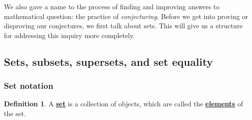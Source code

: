 \documentclass[11pt]{article}
\renewcommand\emph[1]{\underline{\bf{#1}}} %
\theoremstyle{definition}
\newtheorem{definition}[theorem]{Definition}
\begin{document}
We also gave a name to the process of finding and improving answers to mathematical question: the practice of {\it conjecturing}. Before we get into proving or disproving our conjectures, we first talk about sets. This will give us a structure for addressing this inquiry more completely.

\vspace*{8pt}
\subsection{Sets, subsets, supersets, and set equality}

\subsubsection{Set notation}\label{s: set notation}


\vspace*{8pt}

\begin{definition}\label{definition: set} A \emph{set} is a collection of objects, which are called the \emph{elements} of the set.
\end{definition}
\end{document}
